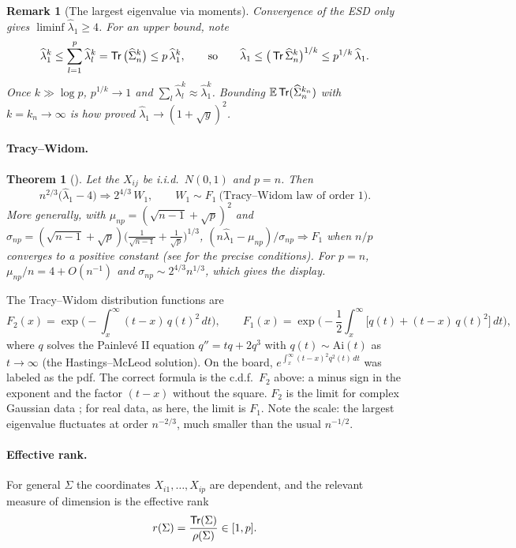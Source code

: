 \documentclass[11pt]{article}
\newtheorem{thm}{Theorem}
\newtheorem{remark}{Remark}
\newcommand{\wh}{\widehat}
\newcommand{\Expect}{\mathbb{E}}
\newcommand{\Tr}{\mathop{\sf Tr}}
\begin{document}
\begin{remark}[The largest eigenvalue via moments]
Convergence of the ESD only gives $\liminf\wh\lambda_1\ge4$. For an upper bound, note
\[
\wh\lambda_1^k\le\sum_{l=1}^p\wh\lambda_l^k=\Tr\big(\wh\Sigma_n^k\big)\le p\,\wh\lambda_1^k,
\qquad\text{so}\qquad
\wh\lambda_1\le\big(\Tr\wh\Sigma_n^k\big)^{1/k}\le p^{1/k}\,\wh\lambda_1 .
\]
Once $k\gg\log p$, $p^{1/k}\to1$ and $\sum_l\wh\lambda_l^k\approx\wh\lambda_1^k$. Bounding $\Expect\Tr(\wh\Sigma_n^{k_n})$ with $k=k_n\to\infty$ is how \citet{Gem80} proved $\wh\lambda_1\to(1+\sqrt y)^2$.
\end{remark}

\paragraph{Tracy--Widom.}

\begin{thm}[\citet{Joh01}]\label{thm:tw}
Let the $X_{ij}$ be i.i.d.\ $N(0,1)$ and $p=n$. Then
\[
n^{2/3}\big(\wh\lambda_1-4\big)\Rightarrow2^{4/3}\,W_1,\qquad W_1\sim F_1\ \text{(Tracy--Widom law of order 1)}.
\]
More generally, with $\mu_{np}=(\sqrt{n-1}+\sqrt p)^2$ and $\sigma_{np}=(\sqrt{n-1}+\sqrt p)\big(\frac1{\sqrt{n-1}}+\frac1{\sqrt p}\big)^{1/3}$, $(n\wh\lambda_1-\mu_{np})/\sigma_{np}\Rightarrow F_1$ when $n/p$ converges to a positive constant (see \citet{Joh01} for the precise conditions). For $p=n$, $\mu_{np}/n=4+O(n^{-1})$ and $\sigma_{np}\sim2^{4/3}n^{1/3}$, which gives the display.
\end{thm}

The Tracy--Widom distribution functions are \citep{TW94,TW96}
\[
F_2(x)=\exp\Big(-\int_x^\infty(t-x)\,q(t)^2\,dt\Big),\qquad
F_1(x)=\exp\Big(-\frac12\int_x^\infty\big[q(t)+(t-x)\,q(t)^2\big]\,dt\Big),
\]
where $q$ solves the Painlevé II equation $q''=tq+2q^3$ with $q(t)\sim\mathrm{Ai}(t)$ as $t\to\infty$ (the Hastings--McLeod solution). On the board, $e^{\int_x^\infty(t-x)^2q^2(t)\,dt}$ was labeled as the pdf. The correct formula is the c.d.f.\ $F_2$ above: a minus sign in the exponent and the factor $(t-x)$ without the square. $F_2$ is the limit for complex Gaussian data \citep{Joh00}; for real data, as here, the limit is $F_1$. Note the scale: the largest eigenvalue fluctuates at order $n^{-2/3}$, much smaller than the usual $n^{-1/2}$.

\paragraph{Effective rank.}
For general $\Sigma$ the coordinates $X_{i1},\dots,X_{ip}$ are dependent, and the relevant measure of dimension is the effective rank
\[
r(\Sigma)=\frac{\Tr(\Sigma)}{\rho(\Sigma)}\in[1,p].
\]
\end{document}
